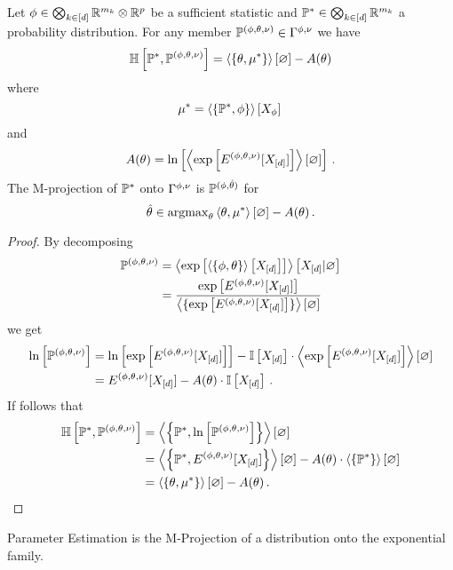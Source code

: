 \begin{lemma}
	Let $\phi\in\bigotimes_{k\in[d]} \mathbb{R}^{m_{k}}\otimes\mathbb{R}^{p}$ be a sufficient statistic and $\mathbb{P}^*\in\bigotimes_{k\in[d]} \mathbb{R}^{m_{k}}$ a probability distribution.
	For any member $\mathbb{P}^{(\phi,\theta,\nu)}\in\Gamma^{\phi,\nu}$ we have
		\[ \mathbb{H}\left[\mathbb{P}^*,\mathbb{P}^{(\phi,\theta,\nu)}\right] = \left\langle \left\{\theta,\mu^*\right\}\right\rangle \left[ \varnothing \right] - A(\theta) \]
	where 
		\[ \mu^* = \left\langle \left\{\mathbb{P}^*,\phi\right\}\right\rangle \left[ X_{\phi} \right] \,  \]
	and 
		\[ A(\theta) = \ln \left[ \left\langle \mathrm{exp}\left[E^{(\phi,\theta,\nu)}[X_{[d]}]\right]\right\rangle \left[ \varnothing \right] \right] \, . \]
	The M-projection of $\mathbb{P}^*$ onto $\Gamma^{\phi,\nu}$ is  $\mathbb{P}^{(\phi,\hat{\theta})}$ for
		\[ \hat{\theta}\in \mathrm{argmax}_{\theta}  \left\langle \theta, \mu^*\right\rangle \left[ \varnothing \right] - A(\theta) \, .  \]
\end{lemma}
\begin{proof}
	By decomposing 
	\begin{align*}
		\mathbb{P}^{(\phi,\theta,\nu)} 	& = \left\langle \mathrm{exp}\left[\left\langle \{\phi, \theta\}\right\rangle \left[ X_{[d]} \right]\right]\right\rangle \left[ X_{[d]} | \varnothing \right] \\
				& = \frac{\mathrm{exp}\left[E^{(\phi,\theta,\nu)}[X_{[d]}]\right]}{\left\langle \{\mathrm{exp}\left[E^{(\phi,\theta,\nu)}[X_{[d]}]\right]\}\right\rangle \left[ \varnothing \right]}
	\end{align*}
	we get
	\begin{align*}
		\ln \left[ \mathbb{P}^{(\phi,\theta,\nu)} \right] & = \ln \left[ \mathrm{exp}\left[E^{(\phi,\theta,\nu)}[X_{[d]}]\right] \right] - \mathbb{I}\left[X_{[d]}\right] \cdot \left\langle \mathrm{exp}\left[E^{(\phi,\theta,\nu)}[X_{[d]}]\right]\right\rangle \left[ \varnothing \right] \\ 
		& = E^{(\phi,\theta,\nu)}[X_{[d]}] - A(\theta) \cdot \mathbb{I}\left[X_{[d]}\right]  \, .
	\end{align*}
	If follows that
	\begin{align*}
		\mathbb{H}\left[\mathbb{P}^*,\mathbb{P}^{(\phi,\theta,\nu)}\right] 
		&=  \left\langle \left\{\mathbb{P}^*,\ln \left[ \mathbb{P}^{(\phi,\theta,\nu)} \right]\right\}\right\rangle \left[ \varnothing \right] \\
		&=  \left\langle \left\{\mathbb{P}^*,E^{(\phi,\theta,\nu)}[X_{[d]}]\right\}\right\rangle \left[ \varnothing \right] - A(\theta) \cdot \left\langle \{\mathbb{P}^*\}\right\rangle \left[ \varnothing \right]   \\
		&= \left\langle \left\{\theta, \mu^*\right\}\right\rangle \left[ \varnothing \right] - A(\theta) \, . 
	\end{align*}
\end{proof}





Parameter Estimation is the M-Projection of a distribution onto the exponential family.


